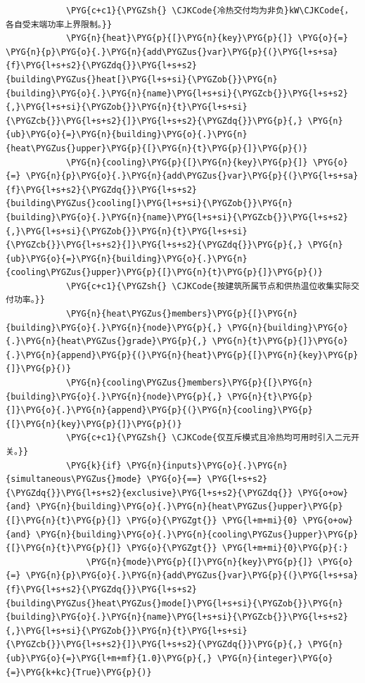 \begin{Verbatim}
            \PYG{c+c1}{\PYGZsh{} \CJKCode{冷热交付均为非负}kW\CJKCode{，各自受末端功率上界限制。}}
            \PYG{n}{heat}\PYG{p}{[}\PYG{n}{key}\PYG{p}{]} \PYG{o}{=} \PYG{n}{p}\PYG{o}{.}\PYG{n}{add\PYGZus{}var}\PYG{p}{(}\PYG{l+s+sa}{f}\PYG{l+s+s2}{\PYGZdq{}}\PYG{l+s+s2}{building\PYGZus{}heat[}\PYG{l+s+si}{\PYGZob{}}\PYG{n}{building}\PYG{o}{.}\PYG{n}{name}\PYG{l+s+si}{\PYGZcb{}}\PYG{l+s+s2}{,}\PYG{l+s+si}{\PYGZob{}}\PYG{n}{t}\PYG{l+s+si}{\PYGZcb{}}\PYG{l+s+s2}{]}\PYG{l+s+s2}{\PYGZdq{}}\PYG{p}{,} \PYG{n}{ub}\PYG{o}{=}\PYG{n}{building}\PYG{o}{.}\PYG{n}{heat\PYGZus{}upper}\PYG{p}{[}\PYG{n}{t}\PYG{p}{]}\PYG{p}{)}
            \PYG{n}{cooling}\PYG{p}{[}\PYG{n}{key}\PYG{p}{]} \PYG{o}{=} \PYG{n}{p}\PYG{o}{.}\PYG{n}{add\PYGZus{}var}\PYG{p}{(}\PYG{l+s+sa}{f}\PYG{l+s+s2}{\PYGZdq{}}\PYG{l+s+s2}{building\PYGZus{}cooling[}\PYG{l+s+si}{\PYGZob{}}\PYG{n}{building}\PYG{o}{.}\PYG{n}{name}\PYG{l+s+si}{\PYGZcb{}}\PYG{l+s+s2}{,}\PYG{l+s+si}{\PYGZob{}}\PYG{n}{t}\PYG{l+s+si}{\PYGZcb{}}\PYG{l+s+s2}{]}\PYG{l+s+s2}{\PYGZdq{}}\PYG{p}{,} \PYG{n}{ub}\PYG{o}{=}\PYG{n}{building}\PYG{o}{.}\PYG{n}{cooling\PYGZus{}upper}\PYG{p}{[}\PYG{n}{t}\PYG{p}{]}\PYG{p}{)}
            \PYG{c+c1}{\PYGZsh{} \CJKCode{按建筑所属节点和供热温位收集实际交付功率。}}
            \PYG{n}{heat\PYGZus{}members}\PYG{p}{[}\PYG{n}{building}\PYG{o}{.}\PYG{n}{node}\PYG{p}{,} \PYG{n}{building}\PYG{o}{.}\PYG{n}{heat\PYGZus{}grade}\PYG{p}{,} \PYG{n}{t}\PYG{p}{]}\PYG{o}{.}\PYG{n}{append}\PYG{p}{(}\PYG{n}{heat}\PYG{p}{[}\PYG{n}{key}\PYG{p}{]}\PYG{p}{)}
            \PYG{n}{cooling\PYGZus{}members}\PYG{p}{[}\PYG{n}{building}\PYG{o}{.}\PYG{n}{node}\PYG{p}{,} \PYG{n}{t}\PYG{p}{]}\PYG{o}{.}\PYG{n}{append}\PYG{p}{(}\PYG{n}{cooling}\PYG{p}{[}\PYG{n}{key}\PYG{p}{]}\PYG{p}{)}
            \PYG{c+c1}{\PYGZsh{} \CJKCode{仅互斥模式且冷热均可用时引入二元开关。}}
            \PYG{k}{if} \PYG{n}{inputs}\PYG{o}{.}\PYG{n}{simultaneous\PYGZus{}mode} \PYG{o}{==} \PYG{l+s+s2}{\PYGZdq{}}\PYG{l+s+s2}{exclusive}\PYG{l+s+s2}{\PYGZdq{}} \PYG{o+ow}{and} \PYG{n}{building}\PYG{o}{.}\PYG{n}{heat\PYGZus{}upper}\PYG{p}{[}\PYG{n}{t}\PYG{p}{]} \PYG{o}{\PYGZgt{}} \PYG{l+m+mi}{0} \PYG{o+ow}{and} \PYG{n}{building}\PYG{o}{.}\PYG{n}{cooling\PYGZus{}upper}\PYG{p}{[}\PYG{n}{t}\PYG{p}{]} \PYG{o}{\PYGZgt{}} \PYG{l+m+mi}{0}\PYG{p}{:}
                \PYG{n}{mode}\PYG{p}{[}\PYG{n}{key}\PYG{p}{]} \PYG{o}{=} \PYG{n}{p}\PYG{o}{.}\PYG{n}{add\PYGZus{}var}\PYG{p}{(}\PYG{l+s+sa}{f}\PYG{l+s+s2}{\PYGZdq{}}\PYG{l+s+s2}{building\PYGZus{}heat\PYGZus{}mode[}\PYG{l+s+si}{\PYGZob{}}\PYG{n}{building}\PYG{o}{.}\PYG{n}{name}\PYG{l+s+si}{\PYGZcb{}}\PYG{l+s+s2}{,}\PYG{l+s+si}{\PYGZob{}}\PYG{n}{t}\PYG{l+s+si}{\PYGZcb{}}\PYG{l+s+s2}{]}\PYG{l+s+s2}{\PYGZdq{}}\PYG{p}{,} \PYG{n}{ub}\PYG{o}{=}\PYG{l+m+mf}{1.0}\PYG{p}{,} \PYG{n}{integer}\PYG{o}{=}\PYG{k+kc}{True}\PYG{p}{)}

\end{Verbatim}
